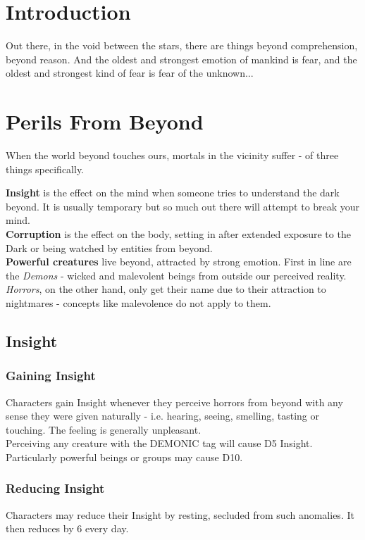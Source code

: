 \documentclass[12pt,a4paper,openany]{book}
\begin{document}
	
	
	\chapter{Introduction}
	Out there, in the void between the stars, there are things beyond comprehension, beyond reason. And the oldest and strongest emotion of mankind is fear, and the oldest and strongest kind of fear is fear of the unknown...

	\chapter{Perils From Beyond}
	When the world beyond touches ours, mortals in the vicinity suffer - of three things specifically.
	\par
	\textbf{Insight} is the effect on the mind when someone tries to understand the dark beyond.
	It is usually temporary
		but so much out there will attempt to break your mind.
	\\
	\textbf{Corruption} is the effect on the body,
		setting in after extended exposure to the Dark
		or being watched by entities from beyond.
	\\
	\textbf{Powerful creatures} live beyond, attracted by strong emotion.
	First in line are the \emph{Demons} - wicked and malevolent beings from outside our perceived reality.
	\emph{Horrors}, on the other hand, only get their name due to their attraction to nightmares
		- concepts like malevolence do not apply to them.
	
	\section{Insight}
	\subsection{Gaining Insight}
	Characters gain Insight whenever they perceive horrors from beyond with any sense they were given naturally
		- i.e. hearing, seeing, smelling, tasting or touching.
	The feeling is generally unpleasant.
	\\
	Perceiving any creature with the DEMONIC tag will cause D5 Insight.
	Particularly powerful beings or groups may cause D10.
	\subsection{Reducing Insight}
	Characters may reduce their Insight by resting,
		secluded from such anomalies.
	It then reduces by 6 every day.
\end{document}
